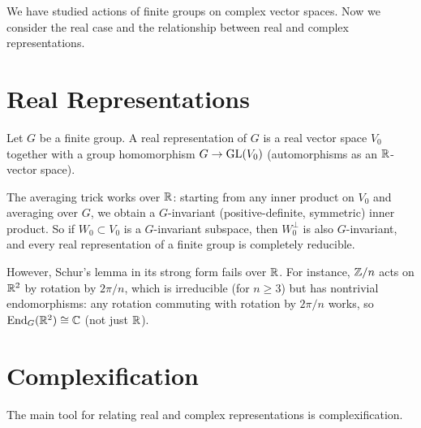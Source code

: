 \documentclass{report}
\begin{document}

We have studied actions of finite groups on complex vector spaces. Now we consider the real case and the relationship between real and complex representations.

\section{Real Representations}

Let \(G\) be a finite group. A real representation of \(G\) is a real vector space \(V_0\) together with a group homomorphism \(G \to \operatorname{GL}(V_0)\) (automorphisms as an \(\RR\)-vector space).

The averaging trick works over \(\RR\): starting from any inner product on \(V_0\) and averaging over \(G\), we obtain a \(G\)-invariant (positive-definite, symmetric) inner product. So if \(W_0 \subset V_0\) is a \(G\)-invariant subspace, then \(W_0^\perp\) is also \(G\)-invariant, and every real representation of a finite group is completely reducible.

However, Schur's lemma in its strong form fails over \(\RR\). For instance, \(\ZZ/n\) acts on \(\RR^2\) by rotation by \(2\pi/n\), which is irreducible (for \(n \geq 3\)) but has nontrivial endomorphisms: any rotation commuting with rotation by \(2\pi/n\) works, so \(\End_G(\RR^2) \cong \CC\) (not just \(\RR\)).

\section{Complexification}

The main tool for relating real and complex representations is complexification.



\end{document}

